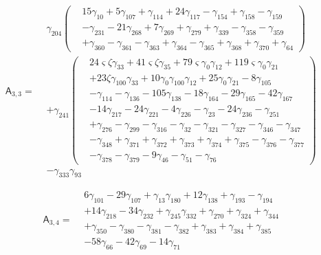 \[\mathsf A_{3,3}=\begin{aligned}& \gamma_{204} \left(\begin{aligned}& 15 \gamma_{10}+ 5 \gamma_{107}+ \gamma_{114}+ 24 \gamma_{117}- \gamma_{154}+ \gamma_{158}- \gamma_{159}\\&- \gamma_{231}- 21 \gamma_{268}+ 7 \gamma_{269}+ \gamma_{279}+ \gamma_{339}- \gamma_{358}- \gamma_{359}\\&+ \gamma_{360}- \gamma_{361}- \gamma_{363}+ \gamma_{364}- \gamma_{365}+ \gamma_{368}+ \gamma_{370}+ \gamma_{64}\end{aligned}\right)\\&+ \gamma_{241} \left(\begin{aligned}& 24 \varsigma  \zeta  \gamma_{33}+ 41 \varsigma  \zeta  \gamma_{35}+ 79 \varsigma  \gamma_{0} \gamma_{12}+ 119 \varsigma  \gamma_{0} \gamma_{21}\\&+ 23 \zeta  \gamma_{100} \gamma_{33}+ 10 \gamma_{0} \gamma_{100} \gamma_{12}+ 25 \gamma_{0} \gamma_{21}- 8 \gamma_{105}\\&- \gamma_{114}- \gamma_{136}- 105 \gamma_{138}- 18 \gamma_{164}- 29 \gamma_{165}- 42 \gamma_{167}\\&- 14 \gamma_{217}- 24 \gamma_{221}- 4 \gamma_{226}- \gamma_{23}- 24 \gamma_{236}- \gamma_{251}\\&+ \gamma_{276}- \gamma_{299}- \gamma_{316}- \gamma_{32}- \gamma_{321}- \gamma_{327}- \gamma_{346}- \gamma_{347}\\&- \gamma_{348}+ \gamma_{371}+ \gamma_{372}+ \gamma_{373}+ \gamma_{374}+ \gamma_{375}- \gamma_{376}- \gamma_{377}\\&- \gamma_{378}- \gamma_{379}- 9 \gamma_{46}- \gamma_{51}- \gamma_{76}\end{aligned}\right)\\&- \gamma_{333} \gamma_{93}\end{aligned}\]

\[\mathsf A_{3,4}=\begin{aligned}& 6 \gamma_{101}- 29 \gamma_{107}+ \gamma_{13} \gamma_{180}+ 12 \gamma_{138}+ \gamma_{193}- \gamma_{194}\\&+ 14 \gamma_{218}- 34 \gamma_{232}+ \gamma_{245} \gamma_{332}+ \gamma_{270}+ \gamma_{324}+ \gamma_{344}\\&+ \gamma_{350}- \gamma_{380}- \gamma_{381}- \gamma_{382}+ \gamma_{383}+ \gamma_{384}+ \gamma_{385}\\&- 58 \gamma_{66}- 42 \gamma_{69}- 14 \gamma_{71}\end{aligned}\]

